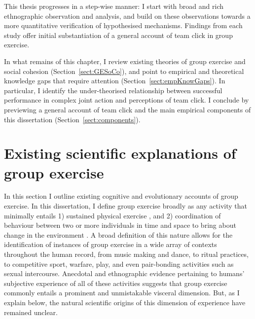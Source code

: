 \begin{CJK}{UTF8}{gbsn}
This thesis progresses in a step-wise manner: I start with broad and rich ethnographic observation and analysis, and build on these observations towards a more quantitative verification of hypothesised mechanisms.  Findings from each study offer initial substantiation of a general account of team click in group exercise.


In what remains of this chapter, I review existing theories of group exercise and social cohesion (Section~\ref{sect:GESoCo}), and point to empirical and theoretical knowledge gaps that require attention (Section~\ref{sect:empKnowGaps}).  In particular, I identify the under-theorised relationship between successful performance in complex joint action and perceptions of team click.  I conclude by previewing a general account of team click and the main empirical components of this dissertation (Section~\ref{sect:components}).



\section{Existing scientific explanations of group exercise\label{sect:GESoCo}}

In this section I outline existing cognitive and evolutionary accounts of group exercise.  In this dissertation, I define group exercise broadly as any activity that minimally entails 1) sustained physical exercise \citep[i.e., structured physical activity that reaches at least low intensity physiological exertion of 45\% of max heart rate or above; see][]{Caspersen1985}, and 2) coordination of behaviour between two or more individuals in time and space to bring about change in the environment \citep[a.k.a., joint action, see][]{Sebanz2006,Vesper2010}.  A broad definition of this nature allows for the identification of instances of group exercise in a wide array of contexts throughout the human record, from music making and dance, to ritual practices, to competitive sport, warfare, play, and even pair-bonding activities such as sexual intercourse.  Anecdotal and ethnographic evidence pertaining to humans' subjective experience of all of these activities suggests that group exercise commonly entails a prominent and unmistakable visceral dimension. But, as I explain below, the natural scientific origins of this dimension of experience have remained unclear.



\end{CJK}

